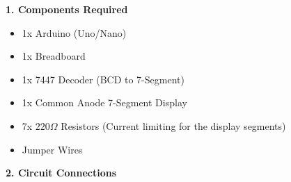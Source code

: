 \documentclass[12pt, a4paper]{article}
\begin{document}
																																																																																																																																																					      \begin{hardwarebox}
																																																																																																																																																					          \textbf{1. Components Required}
																																																																																																																																																						      \begin{itemize}[itemsep=0.1em]
																																																																																																																																																						              \item 1x Arduino (Uno/Nano)
																																																																																																																																																							              \item 1x Breadboard
																																																																																																																																																								              \item 1x 7447 Decoder (BCD to 7-Segment)
																																																																																																																																																									              \item 1x Common Anode 7-Segment Display
																																																																																																																																																										              \item 7x $220\Omega$ Resistors (Current limiting for the display segments)
																																																																																																																																																											              \item Jumper Wires
																																																																																																																																																												          \end{itemize}

																																																																																																																																																													      \vspace{0.4cm}
																																																																																																																																																													          \textbf{2. Circuit Connections} 
																																																																																																																																																														      

\end{hardwarebox}
\end{document}
